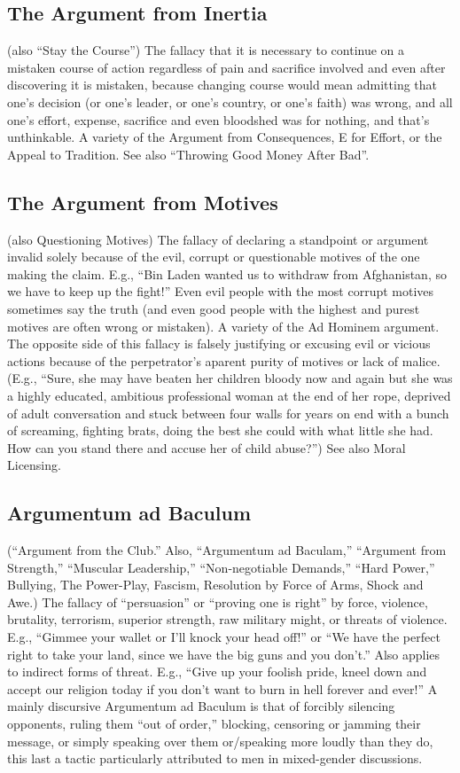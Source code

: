 \documentclass[10pt,a4paper,british]{article}
\begin{document}
\begin{multicols}{2}
    \subsection{The Argument from Inertia} (also “Stay the Course”) The fallacy that it is necessary to continue on a mistaken course of action regardless of pain and sacrifice involved  and even after discovering it is mistaken, because changing course would mean admitting that one's decision (or one's leader, or one's country, or one's faith) was wrong, and all one's effort, expense, sacrifice and even bloodshed was for nothing, and that's unthinkable. A variety of the Argument from Consequences, E for Effort, or the Appeal to Tradition. See also ``Throwing Good Money After Bad''.  

    \subsection{The Argument from Motives} (also Questioning Motives) The fallacy of declaring a standpoint or argument invalid solely because of the evil, corrupt or questionable motives of the one making the claim. E.g., ``Bin Laden wanted us to withdraw from Afghanistan, so we have to keep up the fight!'' Even evil people with the most corrupt motives sometimes say the truth (and even good people with the highest and purest motives are often wrong or mistaken). A variety of the Ad Hominem argument. The opposite side of this fallacy is falsely justifying or excusing evil or vicious actions because of the perpetrator's aparent purity of motives or lack of malice.  (E.g., ``Sure, she may have beaten her children bloody now and again but she was a highly educated, ambitious professional woman at the end of her rope, deprived of adult conversation and stuck between four walls for years on end with a bunch of screaming, fighting brats, doing the best she could with what little she had. How can you stand there and accuse her of child abuse?'') See also Moral Licensing.  

    \subsection{Argumentum ad Baculum} (``Argument from the Club.'' Also, ``Argumentum ad Baculam,'' ``Argument from Strength,'' ``Muscular Leadership,'' ``Non{-}negotiable Demands,'' ``Hard Power,'' Bullying, The Power{-}Play, Fascism, Resolution by Force of Arms, Shock and Awe.) The fallacy of ``persuasion'' or ``proving one is right'' by force, violence, brutality, terrorism, superior strength, raw military might, or threats of violence. E.g., ``Gimmee your wallet or I'll knock your head off!'' or ``We have the perfect right to take your land, since we have the big guns and you don't.'' Also applies to indirect forms of threat. E.g., ``Give up your foolish pride, kneel down and accept our religion today if you don't want to burn in hell forever and ever!'' A mainly discursive Argumentum ad Baculum is that of forcibly silencing opponents, ruling them ``out of order,'' blocking, censoring or jamming their message, or simply speaking over them or/speaking more loudly than they do, this last a tactic particularly attributed to men in mixed{-}gender discussions.  


\end{multicols}
\end{document}
